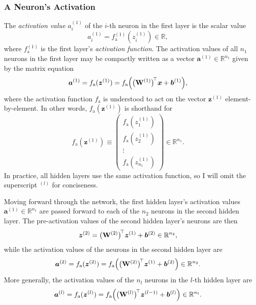 \documentclass[11pt, a4paper]{article}
\renewcommand{\vec}[1]{\bm{#1}}
\newcommand{\mat}[1]{\mathbf{#1}}
\newcommand{\W}{\mat{W}}
\newcommand{\x}{\vec{x}}
\renewcommand{\b}{\vec{b}}
\newcommand{\z}{\vec{z}}
\renewcommand{\a}{\vec{a}}
\begin{document}
\subsubsection{A Neuron's Activation}
The \textit{activation value} $ a_{i}^{(1)} $ of the $ i $-th neuron in the first layer is the scalar value
\begin{equation*}
    a_{i}^{(1)} = f_{\text{a}}^{(1)}(z_{i}^{(1)}) \in \mathbb{R},
\end{equation*}
where $ f_{\text{a}}^{(1)} $ is the first layer's \textit{activation function}. The activation values of all $ n_{1} $ neurons in the first layer may be compactly written as a vector $ \a^{(1)} \in \mathbb{R}^{n_{1}} $ given by the matrix equation
\begin{equation*}
    \a^{(1)} = f_{\text{a}}(\z^{(1)}) = f_{\text{a}} \Big(\big( \W^{(1)} \big)^{\mspace{-4mu}\top}\x + \b^{(1)}\Big),
\end{equation*}
where the activation function $ f_{\text{a}} $ is understood to act on the vector $ \z^{(1)} $ element-by-element. In other words, $ f_{\text{a}} (\z^{(1)}) $ is shorthand for
\begin{equation*}
    f_{\text{a}} (\z^{(1)}) \equiv 
    \begin{pmatrix}
        f_{\text{a}}(z_{1}^{(1)})\\[1mm]
        f_{\text{a}}(z_{2}^{(1)})\\
        \vdots\\[0.5mm]
        f_{\text{a}}(z_{n_{1}}^{(1)})
    \end{pmatrix}
    \in \mathbb{R}^{n_{1}}.
\end{equation*}
In practice, all hidden layers use the same activation function, so I will omit the superscript $ {}^{(l)} $ for conciseness. 

Moving forward through the network, the first hidden layer's activation values $ \a^{(1)} \in \mathbb{R}^{n_{1}} $ are passed forward to each of the $ n_{2} $ neurons in the second hidden layer. The pre-activation values of the second hidden layer's neurons are then
\begin{equation*}
    \z^{(2)} = \big( \W^{(2)} \big)^{\mspace{-4mu}\top} \z^{(1)} + \b^{(2)} \in \mathbb{R}^{n_{2}},
\end{equation*}
while the activation values of the neurons in the second hidden layer are
\begin{equation*}
    \a^{(2)} = f_{\text{a}}(\z^{(2)}) = f_{\text{a}} \Big( \big( \W^{(2)} \big)^{\mspace{-4mu}\top} \z^{(1)} + \b^{(2)}\Big) \in \mathbb{R}^{n_{2}}.
\end{equation*}
More generally, the activation values of the $ n_{l} $ neurons in the $ l $-th hidden layer are
\begin{equation*}
    \a^{(l)} = f_{\text{a}}(\z^{(l)}) = f_{\text{a}} \Big( \big( \W^{(l)} \big)^{\mspace{-4mu}\top} \z^{(l-1)} + \b^{(l)}\Big) \in \mathbb{R}^{n_{l}}.
\end{equation*} 
\end{document}
